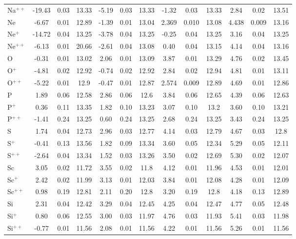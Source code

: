\begin{longtable}{l!{\vrule width 0.25pt}ccc!{\vrule width 0.25pt}ccc!{\vrule width 0.25pt}ccc!{\vrule width 0.25pt}ccc}
Na$^{++}$ & -19.43 & 0.03 & 13.33 & -5.19 & 0.03 & 13.33 & -1.32 & 0.03 & 13.33 & 2.84 & 0.02 & 13.51 \\
Ne & -6.67 & 0.01 & 12.89 & -1.39 & 0.01 & 13.04 & 2.369 & 0.010 & 13.08 & 4.438 & 0.009 & 13.16 \\
Ne$^+$ & -14.72 & 0.04 & 13.25 & -3.78 & 0.04 & 13.25 & -0.25 & 0.04 & 13.25 & 3.16 & 0.04 & 13.25 \\
Ne$^{++}$ & -6.13 & 0.01 & 20.66 & -2.61 & 0.04 & 13.08 & 0.40 & 0.04 & 13.15 & 4.14 & 0.04 & 13.16 \\
O & -0.31 & 0.01 & 13.02 & 2.06 & 0.01 & 13.09 & 3.87 & 0.01 & 13.29 & 4.76 & 0.02 & 13.45 \\
O$^+$ & -4.81 & 0.02 & 12.92 & -0.74 & 0.02 & 12.92 & 2.84 & 0.02 & 12.94 & 4.81 & 0.01 & 13.11 \\
O$^{++}$ & -5.22 & 0.01 & 12.9 & -0.47 & 0.01 & 12.87 & 2.574 & 0.009 & 12.89 & 4.69 & 0.01 & 12.86 \\
P & 1.89 & 0.06 & 12.58 & 2.86 & 0.06 & 12.6 & 3.84 & 0.06 & 12.65 & 4.39 & 0.06 & 12.63 \\
P$^+$ & 0.36 & 0.11 & 13.35 & 1.82 & 0.10 & 13.23 & 3.07 & 0.10 & 13.2 & 3.60 & 0.10 & 13.21 \\
P$^{++}$ & -1.41 & 0.24 & 13.25 & 0.60 & 0.24 & 13.25 & 2.68 & 0.24 & 13.25 & 3.43 & 0.24 & 13.25 \\
S & 1.74 & 0.04 & 12.73 & 2.96 & 0.03 & 12.77 & 4.14 & 0.03 & 12.79 & 4.67 & 0.03 & 12.8 \\
S$^+$ & -0.41 & 0.13 & 13.56 & 1.82 & 0.09 & 13.34 & 3.60 & 0.05 & 12.34 & 5.29 & 0.05 & 12.11 \\
S$^{++}$ & -2.64 & 0.04 & 13.34 & 1.52 & 0.03 & 13.26 & 3.50 & 0.02 & 12.69 & 5.30 & 0.02 & 12.07 \\
Sc & 3.05 & 0.02 & 11.72 & 3.55 & 0.02 & 11.8 & 4.12 & 0.01 & 11.96 & 4.53 & 0.01 & 12.01 \\
Sc$^+$ & 2.42 & 0.02 & 11.99 & 3.13 & 0.01 & 12.03 & 3.84 & 0.01 & 12.08 & 4.28 & 0.01 & 12.09 \\
Sc$^{++}$ & 0.98 & 0.19 & 12.81 & 2.11 & 0.20 & 12.8 & 3.20 & 0.19 & 12.8 & 4.18 & 0.13 & 12.89 \\
Si & 2.31 & 0.04 & 12.42 & 3.29 & 0.04 & 12.45 & 4.25 & 0.04 & 12.47 & 4.77 & 0.05 & 12.48 \\
Si$^+$ & 0.80 & 0.06 & 12.55 & 3.00 & 0.03 & 11.97 & 4.76 & 0.03 & 11.93 & 5.41 & 0.03 & 11.98 \\
Si$^{++}$ & -0.77 & 0.01 & 11.56 & 2.08 & 0.01 & 11.56 & 4.22 & 0.01 & 11.56 & 5.26 & 0.01 & 11.56 \\

\end{longtable}
